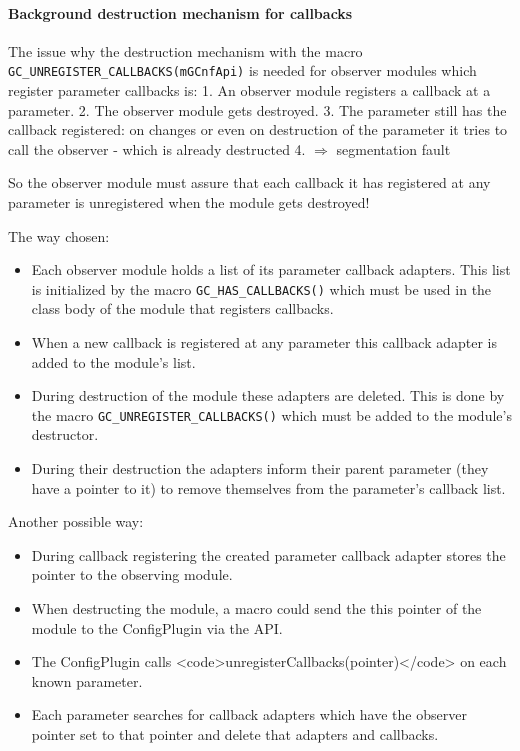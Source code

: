 \paragraph{Background destruction mechanism for callbacks}
The issue why the destruction mechanism with the macro \lstinline|GC_UNREGISTER_CALLBACKS(mGCnfApi)| is needed for observer modules which register parameter callbacks is: 1. An observer module registers a callback at a parameter. 2. The observer module gets destroyed. 3. The parameter still has the callback registered: on changes or even on destruction of the parameter it tries to call the observer - which is already destructed 4. $\Rightarrow$ segmentation fault

So the observer module must assure that each callback it has registered at any parameter is unregistered when the module gets destroyed!

The way chosen:
\begin{itemize}
  \item Each observer module holds a list of its parameter callback adapters. This list is initialized by the macro \lstinline|GC_HAS_CALLBACKS()| which must be used in the class body of the module that registers callbacks.
  \item When a new callback is registered at any parameter this callback adapter is added to the module's list.
  \item During destruction of the module these adapters are deleted. This is done by the macro \lstinline|GC_UNREGISTER_CALLBACKS()| which must be added to the module's destructor.
  \item During their destruction the adapters inform their parent parameter (they have a pointer to it) to remove themselves from the parameter's callback list.
\end{itemize}

Another possible way:
\begin{itemize}
  \item During callback registering the created parameter callback adapter stores the pointer to the observing module.
  \item When destructing the module, a macro could send the this pointer of the module to the ConfigPlugin via the API.
  \item The ConfigPlugin calls <code>unregisterCallbacks(pointer)</code> on each known parameter.
  \item Each parameter searches for callback adapters which have the observer pointer set to that pointer and delete that adapters and callbacks.
\end{itemize}

